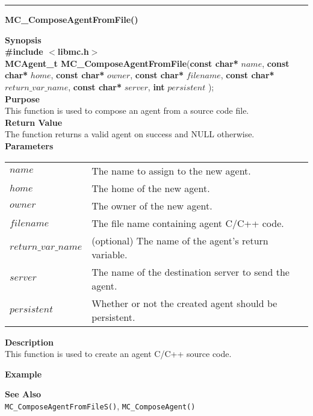 \noindent
\vspace{5pt}
\rule{6.5in}{0.015in}
\noindent
{}
{\LARGE \bf MC\_ComposeAgentFromFile()}\\

\noindent
{\bf Synopsis}\\
{\bf \#include $<$libmc.h$>$}\\
{\bf MCAgent\_t MC\_ComposeAgentFromFile}({\bf const char*} $name$, 
                                  {\bf const char*} $home$,
                                  {\bf const char*} $owner$,
                                  {\bf const char*} $filename$,
                                  {\bf const char*} $return\_var\_name$,
                                  {\bf const char*} $server$,
                                  {\bf int} $persistent$
																	);\\

\noindent
{\bf Purpose}\\
This function is used to compose an agent from a source code file.\\

\noindent
{\bf Return Value}\\
The function returns a valid agent on success and NULL otherwise.\\

\noindent
{\bf Parameters}
\vspace{-0.1in}
\begin{description}
\item
\begin{tabular}{p{30 mm}p{125 mm}} 
$name$ & The name to assign to the new agent.\\
$home$ & The home of the new agent.\\
$owner$ & The owner of the new agent.\\
$filename$ & The file name containing agent C/C++ code.\\
$return\_var\_name$ & (optional) The name of the agent's return variable.\\
$server$ & The name of the destination server to send the agent.\\
$persistent$ & Whether or not the created agent should be persistent.\\
\end{tabular}
\end{description}

\noindent
{\bf Description}\\
This function is used to create an agent C/C++ source code. 

\noindent
{\bf Example}\\
\noindent
{\footnotesize}

\noindent
{\bf See Also}\\
\texttt{MC\_ComposeAgentFromFileS()}, \texttt{MC\_ComposeAgent()}


